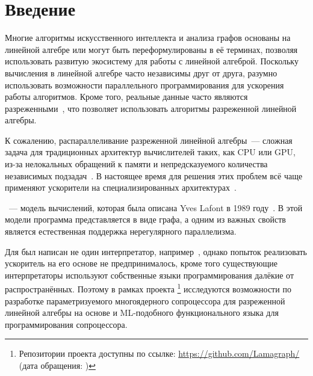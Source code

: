 

\section*{Введение}
\thispagestyle{withCompileDate}

Многие алгоритмы искусственного интеллекта и анализа графов основаны на линейной алгебре или могут быть переформулированы в её терминах, позволяя использовать развитую экосистему для работы с линейной алгеброй.
Поскольку вычисления в линейной алгебре часто независимы друг от друга, разумно использовать возможности параллельного программирования для ускорения работы алгоритмов.
Кроме того, реальные данные часто являются разреженными~\cite{davisUniversityFloridaSparse2011}, что позволяет использовать алгоритмы разреженной линейной алгебры.

К сожалению, распараллеливание разреженной линейной алгебры~--- сложная задача для традиционных архитектур вычислителей таких, как CPU или GPU, из-за нелокальных обращений к памяти и непредсказуемого количества независимых подзадач~\cite{duHighPerformanceSparseLinear2022,isaac-chassandeDedicatedHardwareAccelerators2024,mohammedPerformanceEnhancementStrategies2022}.
В настоящее время для решения этих проблем всё чаще применяют ускорители на специализированных архитектурах~\cite{dakkakAcceleratingReductionScan2019, zhuMobileMachineLearning2018, jouppiInDatacenterPerformanceAnalysis2017, akkadEmbeddedDeepLearning2024, silvanoSurveyDeepLearning2024}.

\INs{}~--- модель вычислений, которая была описана Yves Lafont в 1989 году~\cite{lafontInteractionNets1989}.
В этой модели программа представляется в виде графа, а одним из важных свойств является естественная поддержка нерегулярного параллелизма.

Для \INs{} был написан не один интерпретатор, например~\cite{mackieParallelEvaluationInteraction2016, salikhmetovTokenpassingOptimalReduction2016}, однако попыток реализовать ускоритель на его основе не предпринималось, кроме того существующие интерпретаторы используют собственные языки программирования далёкие от распространённых.
Поэтому в рамках проекта \Lamagraph{}\footnote{Репозитории проекта доступны по ссылке: \url{https://github.com/Lamagraph/} (дата обращения: )} исследуются возможности по разработке параметризуемого многоядерного сопроцессора для разреженной линейной алгебры на основе \INs{} и ML-подобного функционального языка для программирования сопроцессора.
